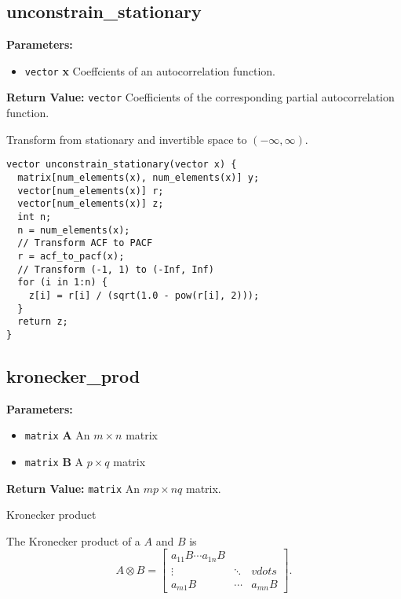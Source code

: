 \documentclass[]{book}
\providecommand{\tightlist}{%
  \setlength{\itemsep}{0pt}\setlength{\parskip}{0pt}}
\begin{document}
\subsection{unconstrain\_stationary}\label{unconstrainux5fstationary}

\textbf{Parameters:}

\begin{itemize}
\tightlist
\item
  \texttt{vector} \textbf{x} Coeffcients of an autocorrelation function.
\end{itemize}

\textbf{Return Value:} \texttt{vector} Coefficients of the corresponding
partial autocorrelation function.

Transform from stationary and invertible space to \((-\infty, \infty)\).

\begin{verbatim}
vector unconstrain_stationary(vector x) {
  matrix[num_elements(x), num_elements(x)] y;
  vector[num_elements(x)] r;
  vector[num_elements(x)] z;
  int n;
  n = num_elements(x);
  // Transform ACF to PACF
  r = acf_to_pacf(x);
  // Transform (-1, 1) to (-Inf, Inf)
  for (i in 1:n) {
    z[i] = r[i] / (sqrt(1.0 - pow(r[i], 2)));
  }
  return z;
}
\end{verbatim}

\subsection{kronecker\_prod}\label{kroneckerux5fprod}

\textbf{Parameters:}

\begin{itemize}
\tightlist
\item
  \texttt{matrix} \textbf{A} An \(m \times n\) matrix
\item
  \texttt{matrix} \textbf{B} A \(p \times q\) matrix
\end{itemize}

\textbf{Return Value:} \texttt{matrix} An \(mp \times nq\) matrix.

Kronecker product

The Kronecker product of a \(A\) and \(B\) is \[
A \otimes B =
\begin{bmatrix}
a_{11} B \cdots a_{1n} B \\
\vdots & \ddots & vdots \\
a_{m1} B & \cdots & a_{mn} B
\end{bmatrix} .
\]
\end{document}
